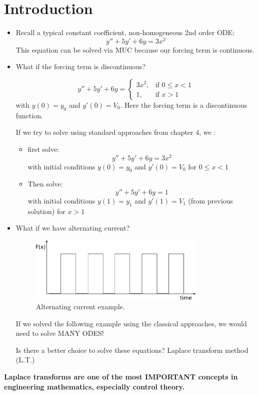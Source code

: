 \section{Introduction}
\begin{itemize}
\item Recall a typical constant coefficient, non-homogeneous 2nd order ODE:
\begin{equation*}
y''+5y'+6y=3x^2
\end{equation*}
This equation can be solved via MUC because our forcing term is continuous.
\item What if the forcing term is discontinuous?

\begin{equation*}
y''+5y'+6y=
\begin{cases}
    3x^2,& \text{if } 0\leq x< 1\\
    1,   &  \text{if } x> 1
\end{cases}
\end{equation*}
with $y(0)=y_0$ and $y'(0)=V_0$. Here the forcing term is a discontinuous function.

If we try to solve using standard approaches from chapter 4, we :
\begin{itemize}
\item first solve:
\begin{equation*}
y''+5y'+6y=3x^2
\end{equation*}
with initial conditions $y(0)=y_0$ and $y'(0)=V_0$ for $0\leq x<1$
\item Then solve:
\begin{equation*}
y''+5y'+6y=1
\end{equation*}
with initial conditions $y(1)=y_1$ and $y'(1)=V_1$ (from previous solution) for $x>1$
\end{itemize}

\item What if we have alternating current?

\begin{figure}
\centering
\includegraphics[width=0.8\textwidth]{figs/AC_current.pdf} 
\caption{Alternating current example.}
\end{figure}
If we solved the following example using the classical approaches, we would need to solve MANY ODES!

Is there a better choice to solve these equations? Laplace transform method (L.T.)\\
\end{itemize}
\textbf{Laplace transforms are one of the most IMPORTANT concepts in engineering mathematics, especially control theory.}


